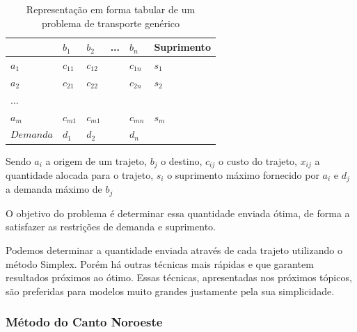 \documentclass [11pt]{articleSBPO}
\begin{document}
\begin{table}[]
	\centering
	\caption[]{Representação em forma tabular de um problema de transporte genérico}
	\label{fig:tabelatransporte}
	\begin{tabular}{ l | l  l  l  l | l }
				& $b_{1}$ 	& $b_{2}$ 	& ... & $b_{n}$  & Suprimento\\
				\hline
	$a_{1}$		& $c_{11}$ 	& $c_{12}$	&  	  & $c_{1n}$ & $s_{1}$\\
	$a_{2}$		& $c_{21}$ 	& $c_{22}$	&  	  & $c_{2n}$ & $s_{2}$\\
	...			&  &  &  &  & \\
	$a_{m}$		& $c_{m1}$ 	& $c_{m1}$	&  	  & $c_{mn}$ & $s_{m}$\\
				\hline
	$Demanda$	& $d_{1}$ 	& $d_{2}$ 	& 	  & $d_{n}$	 & \\
	\end{tabular}
\end{table}

Sendo $a_{i}$ a origem de um trajeto, $b_{j}$ o destino, $c_{ij}$ o custo do trajeto, $x_{ij}$ a quantidade alocada para o trajeto, $s_{i}$ o suprimento máximo fornecido por $a_{i}$ e $d_{j}$ a demanda máximo de $b_{j}$

O objetivo do problema é determinar essa quantidade enviada ótima, de forma a satisfazer as restrições de demanda e suprimento.

Podemos determinar a quantidade enviada através de cada trajeto utilizando o método Simplex. Porém há outras técnicas mais rápidas e que garantem resultados próximos ao ótimo. Essas técnicas, apresentadas nos próximos tópicos, são preferidas para modelos muito grandes justamente pela sua simplicidade.

%
%

\subsubsection{Método do Canto Noroeste}\label{subsubsec:noroeste}
\end{document}
